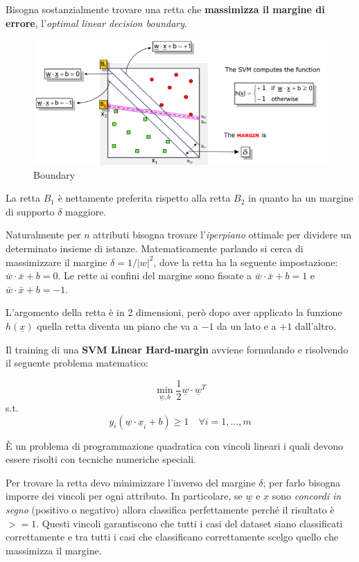 Bisogna sostanzialmente trovare una retta che \textbf{massimizza il margine di errore}, l'\textit{optimal linear decision boundary}. 

\begin{figure}[H]
	\centering
	\includegraphics[width= \linewidth]{classification/pict/svm_boundary.png}
	\caption{Boundary}
\end{figure}

La retta $B_1$ è nettamente preferita rispetto alla retta $B_2$ in quanto ha un margine di supporto $\delta$ maggiore. 

Naturalmente per $n$ attributi bisogna trovare l'\textit{iperpiano} ottimale per dividere un determinato insieme di istanze. Matematicamente parlando si cerca di massimizzare il margine $\delta = 1 / |w|^2$, dove la retta ha la seguente impostazione: $\bar{w} \cdot \bar{x} + b = 0$. Le rette ai confini del margine sono fissate a $\bar{w} \cdot \bar{x} + b = 1$ e $\bar{w} \cdot \bar{x} + b = -1$. 

L'argomento della retta è in 2 dimensioni, però dopo aver applicato la funzione $h(\underline{x})$ quella retta diventa un piano che va a $-1$ da un lato e a $+1$ dall'altro.

Il training di una \textbf{SVM Linear Hard-margin} avviene formulando e risolvendo il seguente problema matematico: 

\[ \min_{\underline{w},b} \frac{1}{2}\underline{w} \cdot \underline{w}^T \]
\qquad s.t.
\[ y_i (\underline{w} \cdot \underline{x}_i + b) \ge 1 \quad \forall i = 1, ..., m\]

È un problema di programmazione quadratica con vincoli lineari i quali devono essere risolti con tecniche numeriche speciali.

Per trovare la retta devo minimizzare l'inverso del margine $\delta$; per farlo bisogna imporre dei vincoli per ogni attributo. In particolare,  se $\underline{w}$ e $\underline{x}$ sono \textit{concordi in segno} (positivo o negativo) allora classifica perfettamente perché il risultato è $>= 1$. Questi vincoli garantiscono che tutti i casi del dataset siano classificati correttamente e tra tutti i casi che classificano correttamente scelgo quello che massimizza il margine. 

